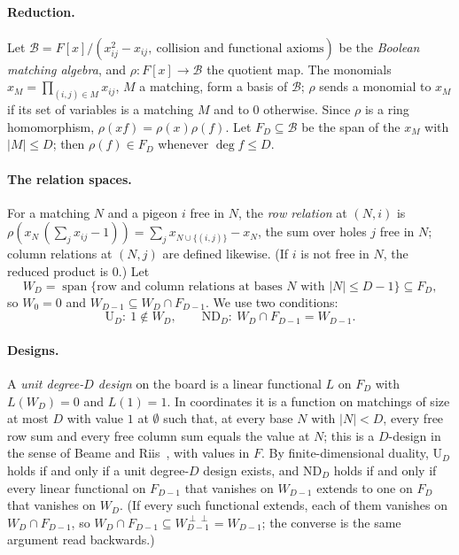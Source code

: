 \paragraph{Reduction.}  Let $\mathcal B=F[x]/(x_{ij}^2-x_{ij},\ \text{collision and
functional axioms})$ be the \emph{Boolean matching algebra}, and $\rho\colon F[x]\to\mathcal B$
the quotient map.  The monomials $x_M=\prod_{(i,j)\in M}x_{ij}$, $M$ a matching, form a
basis of $\mathcal B$; $\rho$ sends a monomial to $x_M$ if its set of variables is a matching
$M$ and to $0$ otherwise.  Since $\rho$ is a ring homomorphism, $\rho(xf)=\rho(x)\rho(f)$.
Let $F_D\subseteq\mathcal B$ be the span of the $x_M$ with $|M|\le D$; then
$\rho(f)\in F_D$ whenever $\deg f\le D$.

\paragraph{The relation spaces.}  For a matching $N$ and a pigeon $i$ free in $N$, the
\emph{row relation} at $(N,i)$ is
$\rho(x_N\,(\sum_j x_{ij}-1))=\sum_{j}x_{N\cup\{(i,j)\}}-x_N$, the sum over holes $j$
free in $N$; column relations at $(N,j)$ are defined likewise.  (If $i$ is not free in
$N$, the reduced product is $0$.)  Let
\[
  W_D=\operatorname{span}\{\text{row and column relations at bases $N$ with } |N|\le D-1\}
  \subseteq F_D,
\]
so $W_0=0$ and $W_{D-1}\subseteq W_D\cap F_{D-1}$.  We use two conditions:
\[
  \mathrm{U}_D:\ 1\notin W_D,\qquad
  \mathrm{ND}_D:\ W_D\cap F_{D-1}=W_{D-1}.
\]

\paragraph{Designs.}  A \emph{unit degree-$D$ design} on the board is a linear functional
$L$ on $F_D$ with $L(W_D)=0$ and $L(1)=1$.  In coordinates it is a function on matchings of
size at most $D$ with value $1$ at $\emptyset$ such that, at every base $N$ with $|N|<D$,
every free row sum and every free column sum equals the value at $N$; this is a
$D$-design in the sense of Beame and Riis~\cite[Def.~8.2]{beame1998counting}, with values
in $F$.  By finite-dimensional duality, $\mathrm{U}_D$ holds if and only if a unit
degree-$D$ design exists, and $\mathrm{ND}_D$ holds if and only if every linear functional
on $F_{D-1}$ that vanishes on $W_{D-1}$ extends to one on $F_D$ that vanishes on $W_D$.
(If every such functional extends, each of them vanishes on $W_D\cap F_{D-1}$, so
$W_D\cap F_{D-1}\subseteq W_{D-1}^{\perp\perp}=W_{D-1}$; the converse is the same
argument read backwards.)

